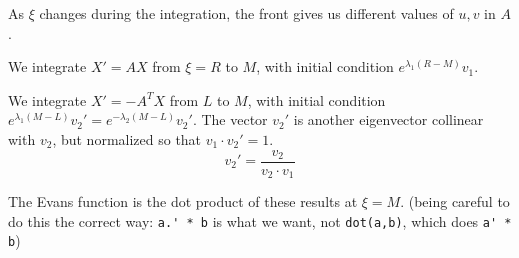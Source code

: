 \documentclass[10pt]{article}
\begin{document}
As $\xi$ changes during the integration, the front gives us different values of $u,v$ in $A$.

We integrate $X' = AX$ from $\xi = R$ to $M$, with initial condition $e^{\lambda_1 (R-M)}v_1$.

We integrate $X' = -A^T X$ from $L$ to $M$, with initial condition $e^{\lambda_1 (M-L)}v_2' = e^{-\lambda_2 (M-L)}v_2'$. The vector $v_2'$ is another eigenvector collinear with $v_2$, but normalized so that $v_1 \cdot v_2' = 1$.
\[v_2' = \frac{v_2}{v_2 \cdot v_1}\]

The Evans function is the dot product of these results at $\xi = M$.
(being careful to do this the correct way: \verb|a.' * b| is what we want,
not \verb|dot(a,b)|, which does \verb|a' * b|)
\end{document}
